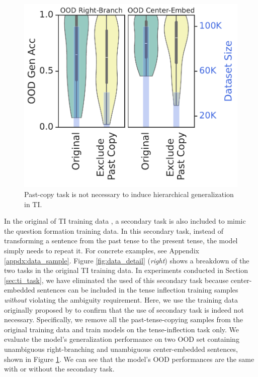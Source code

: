 \begin{figure}
    \vspace{-40px}
    \centering
    \includegraphics[width=1.0\linewidth]{figures/tense_inflection_violin.pdf}
    \caption{Past-copy task is not necessary to induce hierarchical generalization in TI.
    }
    \label{fig:tense_original_violin}
\end{figure}


In the original of TI training data \citep{McCoy2020-pj}, a secondary task is also included to mimic the question formation training data. In this secondary task, instead of transforming a sentence from the past tense to the present tense, the model simply needs to repeat it. For concrete examples, see Appendix \ref{appdx:data_sample}. Figure \ref{fig:data_detail} (\textit{right}) shows a breakdown of the two tasks in the original TI training data. In experiments conducted in Section \ref{sec:ti_task}, we have eliminated the used of this secondary task because center-embedded sentences can be included in the tense inflection training samples \textit{without} violating the ambiguity requirement. Here, we use the training data originally proposed by \citet{McCoy2020-pj} to confirm that the use of secondary task is indeed not necessary. Specifically, we remove all the past-tense-copying samples from the original training data and train models on the tense-inflection task only. We evaluate the model's generalization performance on two OOD set containing unambiguous right-branching and unambiguous center-embedded sentences, shown in Figure \ref{fig:tense_original_violin}. We can see that the model's OOD performances are the same with or without the secondary task. 


